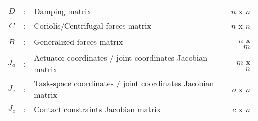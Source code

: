 \begin{table}[htbp]
\begin{tabular}{ c c l r }
			$D$             &  :  & Damping matrix                                             & $n$ x $n$ \\
			$C$             &  :  & Coriolis/Centrifugal forces matrix                         & $n$ x $n$ \\
			$B$             &  :  & Generalized forces matrix                                  & $n$ x $m$ \\
			$J_a$           &  :  & Actuator coordinates / joint coordinates Jacobian matrix   & $m$ x $n$ \\
			$J_e$           &  :  & Task-space coordinates / joint coordinates Jacobian matrix & $o$ x $n$ \\
			$J_c$           &  :  & Contact constraints Jacobian matrix                        & $c$ x $n$  \\
		\hline \hline
        \end{tabular}		
	\label{tab:nom}
\end{table}
